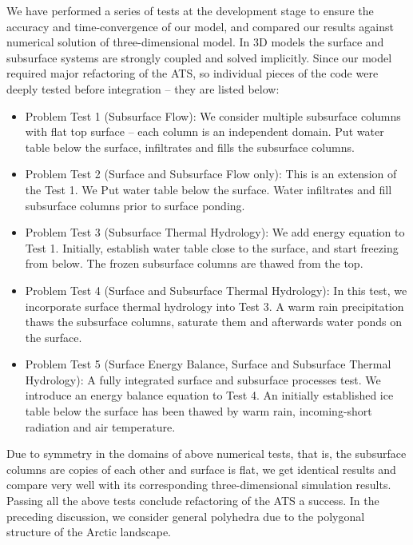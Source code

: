 \documentclass[review]{elsarticle}
\begin{document}
We have performed a series of tests at the development stage to ensure the accuracy and time-convergence of our model, and compared our results against numerical solution of three-dimensional model. In 3D models the surface and subsurface systems are strongly coupled and solved implicitly. Since our model required major refactoring of the ATS, so individual pieces of the code were deeply tested before integration -- they are listed below:  
\begin{itemize}
\item{ Problem Test 1 (Subsurface Flow): 
We consider multiple subsurface columns with flat top surface -- each column is an independent domain. Put water table below the surface, infiltrates and fills the subsurface columns.
}
\item{ Problem Test 2 (Surface and Subsurface Flow only): 
This is an extension of the Test 1. We Put water table below the surface. Water infiltrates and fill subsurface columns prior to surface ponding. 
}

\item{ Problem Test 3 (Subsurface Thermal Hydrology): 
We add energy equation to Test 1. Initially, establish water table close to the surface, and start freezing from below. The frozen subsurface columns are thawed from the top.}

\item{ Problem Test 4 (Surface and Subsurface Thermal Hydrology):
In this test, we incorporate surface thermal hydrology into Test 3. A warm rain precipitation thaws the subsurface columns, saturate them and afterwards water ponds on the surface.}

\item{ Problem Test 5 (Surface Energy Balance, Surface and Subsurface Thermal Hydrology):
A fully integrated surface and subsurface processes test. We introduce an energy balance equation to Test 4. An initially established ice table below the surface has been thawed by warm rain, incoming-short radiation and air temperature.}

\end{itemize}
Due to symmetry in the domains of above numerical tests, that is, the subsurface columns are copies of each other and surface is flat, we get identical results and compare very well with its corresponding three-dimensional simulation results. Passing all the above tests conclude refactoring of the ATS a success. In the preceding discussion, we consider general polyhedra due to the polygonal structure of the Arctic landscape.
\end{document}
